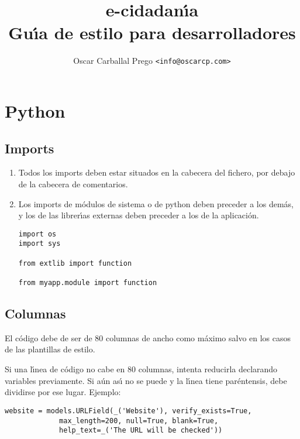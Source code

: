 \documentclass[a4paper, 10pt]{report}
\begin{document}
\title{e-cidadan\'{\i}a\\ Gu\'{\i}a de estilo para desarrolladores}
\author{Oscar Carballal Prego \texttt{<info@oscarcp.com>}}

\maketitle
\newpage 

\tableofcontents
\newpage

\chapter{Python}

\section{Imports}
	\begin{enumerate}
		\item Todos los imports deben estar situados en la cabecera del fichero, por debajo de la cabecera de comentarios.
		\item Los imports de m\'{o}dulos de sistema o de python deben preceder a los dem\'{a}s, y los de las librer\'{\i}as externas deben preceder a los de la aplicaci\'{o}n.

\begin{lstlisting}
import os
import sys

from extlib import function

from myapp.module import function
\end{lstlisting}
	
	\end{enumerate}

\section{Columnas}
El c\'{o}digo debe de ser de 80 columnas de ancho como m\'{a}ximo salvo en los casos de las plantillas de estilo.

Si una l\'{\i}nea de c\'{o}digo no cabe en 80 columnas, intenta reducirla declarando variables previamente. Si a\'{u}n as\'{\i} no se puede y la l\'{\i}nea tiene par\'{e}ntensis, debe dividirse por ese lugar. Ejemplo:

\begin{lstlisting}
website = models.URLField(_('Website'), verify_exists=True,
			 max_length=200, null=True, blank=True,
			 help_text=_('The URL will be checked'))
\end{lstlisting}
\end{document}

